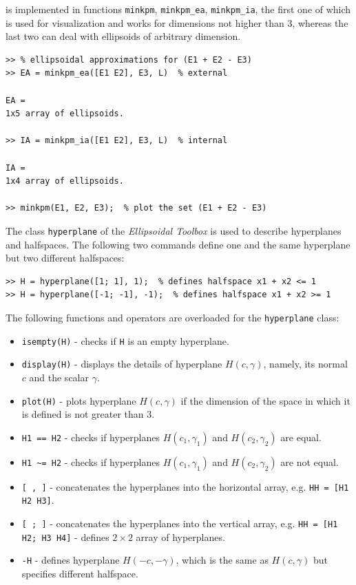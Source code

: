 \documentclass{report}
\begin{document}
is implemented in
functions {\tt minkpm}, {\tt minkpm\_ea}, {\tt minkpm\_ia}, the first one of
which is used for visualization and works for dimensions not higher than $3$,
whereas the last two can deal with ellipsoids of arbitrary dimension.
{\tt \begin{verbatim}
>> % ellipsoidal approximations for (E1 + E2 - E3)
>> EA = minkpm_ea([E1 E2], E3, L)  % external

EA =
1x5 array of ellipsoids.

>> IA = minkpm_ia([E1 E2], E3, L)  % internal

IA =
1x4 array of ellipsoids.

>> minkpm(E1, E2, E3);  % plot the set (E1 + E2 - E3)
\end{verbatim} }

The class {\tt hyperplane} of the {\it Ellipsoidal Toolbox} is used
to describe hyperplanes and halfspaces. The following two commands
define one and the same hyperplane but two different halfspaces:
{\tt \begin{verbatim}
>> H = hyperplane([1; 1], 1);  % defines halfspace x1 + x2 <= 1
>> H = hyperplane([-1; -1], -1);  % defines halfspace x1 + x2 >= 1
\end{verbatim} }
The following functions and operators are overloaded for the
{\tt hyperplane} class:
\begin{itemize}
\item {\tt isempty(H)} - checks if {\tt H} is an empty hyperplane.
\item {\tt display(H)} - displays the details of hyperplane $H(c,\gamma)$,
namely, its normal $c$ and the scalar $\gamma$.
\item {\tt plot(H)} - plots hyperplane $H(c,\gamma)$ if the dimension of the
space in which it is defined  is not greater than 3.
\item {\tt H1 == H2} - checks if hyperplanes $H(c_1,\gamma_1)$ and
$H(c_2,\gamma_2)$ are equal.
\item {\tt H1 \~{ }= H2} - checks if hyperplanes $H(c_1,\gamma_1)$ and
$H(c_2,\gamma_2)$ are not equal.
\item {\tt [ , ]} - concatenates the hyperplanes into the horizontal array, e.g.
{\tt HH = [H1 H2 H3]}.
\item {\tt [ ; ]} - concatenates the hyperplanes into the vertical array, e.g.
{\tt HH = [H1 H2; H3 H4]} - defines $2\times 2$ array of hyperplanes.
\item {\tt -H} - defines hyperplane $H(-c,-\gamma)$, which is the same
as $H(c,\gamma)$ but specifies different halfspace.
\end{itemize}
\end{document}
